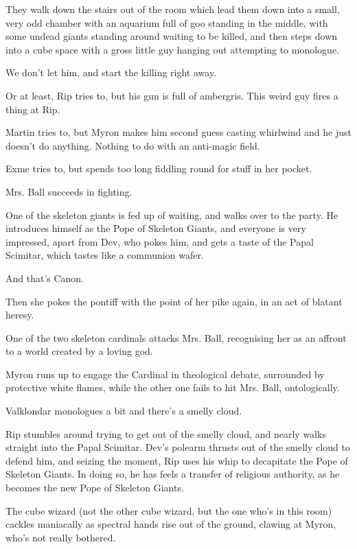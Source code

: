 They walk down the stairs out of the room which lead them down into a small, very odd chamber with an aquarium full of goo standing in the middle, with some undead giants standing around waiting to be killed, and then steps down into a cube space with a gross little guy hanging out attempting to monologue.\medskip

We don’t let him, and start the killing right away.\medskip

Or at least, Rip tries to, but his gun is full of ambergris. This weird guy fires a thing at Rip.\medskip

Martin tries to, but Myron makes him second guess casting whirlwind and he just doesn’t do anything. Nothing to do with an anti-magic field.\medskip

Exme tries to, but spends too long fiddling round for stuff in her pocket.\medskip

Mrs. Ball succeeds in fighting.\medskip

One of the skeleton giants is fed up of waiting, and walks over to the party. He introduces himself as the Pope of Skeleton Giants, and everyone is very impressed, apart from Dev, who pokes him, and gets a taste of the Papal Scimitar, which tastes like a communion wafer.\medskip

And that’s Canon.\medskip

Then she pokes the pontiff with the point of her pike again, in an act of blatant heresy.\medskip

One of the two skeleton cardinals attacks Mrs. Ball, recognising her as an affront to a world created by a loving god.\medskip

Myron runs up to engage the Cardinal in theological debate, surrounded by protective white flames, while the other one fails to hit Mrs. Ball, ontologically.\medskip

Valklondar monologues a bit and there’s a smelly cloud.\medskip

Rip stumbles around trying to get out of the smelly cloud, and nearly walks straight into the Papal Scimitar. Dev’s polearm thrusts out of the smelly cloud to defend him, and seizing the moment, Rip uses his whip to decapitate the Pope of Skeleton Giants. In doing so, he has feels a transfer of religious authority, as he becomes the new Pope of Skeleton Giants.\medskip

The cube wizard (not the other cube wizard, but the one who’s in this room) cackles maniacally as spectral hands rise out of the ground, clawing at Myron, who’s not really bothered.\medskip

